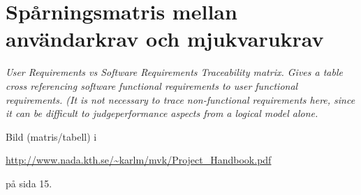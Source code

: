 \documentclass[a4paper, twoside, 11pt, titlepage]{article}
\begin{document}
\clearpage
\section{Spårningsmatris mellan användarkrav och mjukvarukrav}


\emph{User Requirements vs Software Requirements Traceability matrix. Gives a table cross referencing software functional requirements to user functional requirements. (It is not necessary to trace non-functional requirements here, since it can be difficult to judgeperformance aspects from a logical model alone.}

Bild (matris/tabell)  i 

\url{http://www.nada.kth.se/~karlm/mvk/Project_Handbook.pdf}

på sida 15.

\clearpage
	\appendix
\end{document}
